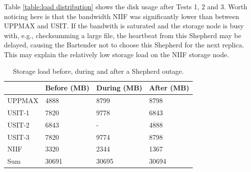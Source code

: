\documentclass[final]{ieee}
\begin{document}
Table \ref{table:load distribution} shows the disk usage after Tests
1, 2 and 3. Worth noticing here is that the bandwidth NIIF was
significantly lower than between UPPMAX and USIT. If the bandwith is
saturated and the storage node is busy with, e.g., checksumming a
large file, the heartbeat from this Shepherd may be delayed, causing the
Bartender not to choose this Shepherd for the next replica. This may explain the
relatively low storage load on the  NIIF storage node.


\begin{table}[ht]
\centering
\begin{tabular}[width = \columnwidth]{llll}
\hline \hline
&\small{Before (MB)}&\small{During (MB)}&\small{After (MB)}\\
\hline
\small{UPPMAX}&4888&8799&8798\\
\small{USIT-1}&7820&9778&6843\\
\small{USIT-2}&6843&-&4888\\
\small{USIT-3}&7820&9774&8798\\
\small{NIIF}&3320&2344&1367\\
\hline
\small{Sum}&30691&30695&30694\\
\hline
\end{tabular}
\caption{Storage load before, during and after a Shepherd outage.}
\label{table:self healing}  
\end{table}      
\end{document}
